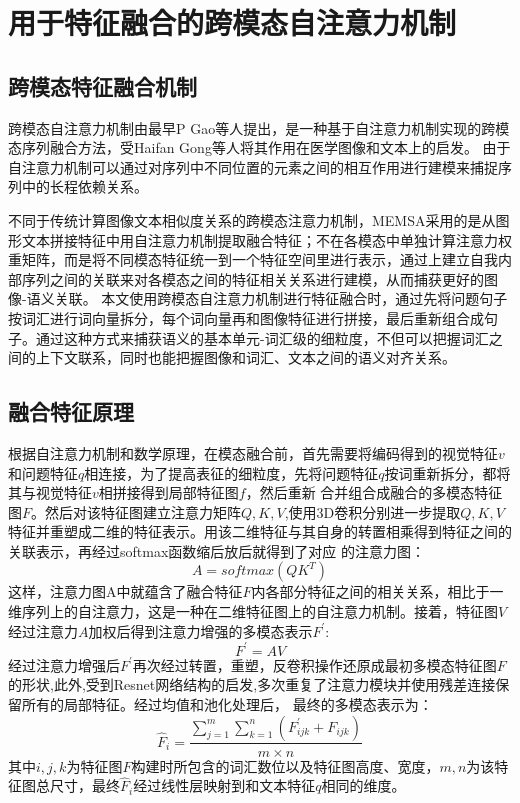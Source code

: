\section{用于特征融合的跨模态自注意力机制}
\subsection{跨模态特征融合机制}
跨模态自注意力机制由最早P Gao等人\cite{gao2019dynamic}提出，是一种基于自注意力机制实现的跨模态序列融合方法，受Haifan Gong等人\cite{gong2021cross}将其作用在医学图像和文本上的启发。
由于自注意力机制可以通过对序列中不同位置的元素之间的相互作用进行建模来捕捉序列中的长程依赖关系。

不同于传统计算图像文本相似度关系的跨模态注意力机制，MEMSA采用的是从图形文本拼接特征中用自注意力机制提取融合特征；不在各模态中单独计算注意力权重矩阵，而是将不同模态特征统一到一个特征空间里进行表示，通过上建立自我内部序列之间的关联来对各模态之间的特征相关关系进行建模，从而捕获更好的图像-语义关联。
本文使用跨模态自注意力机制进行特征融合时，通过先将问题句子按词汇进行词向量拆分，每个词向量再和图像特征进行拼接，最后重新组合成句子。通过这种方式来捕获语义的基本单元-词汇级的细粒度，不但可以把握词汇之间的上下文联系，同时也能把握图像和词汇、文本之间的语义对齐关系。

\subsection{融合特征原理}
根据自注意力机制和数学原理，在模态融合前，首先需要将编码得到的视觉特征$v$和问题特征$q$相连接，为了提高表征的细粒度，先将问题特征$q$按词重新拆分，都将其与视觉特征$v$相拼接得到局部特征图$f$，然后重新
合并组合成融合的多模态特征图$F$。然后对该特征图建立注意力矩阵$Q,K,V$,使用3D卷积分别进一步提取$Q,K,V$特征并重塑成二维的特征表示。用该二维特征与其自身的转置相乘得到特征之间的关联表示，再经过softmax函数缩后放后就得到了对应
的注意力图：
\begin{equation}
	\label{}
	A = softmax(QK^{T})
\end{equation}
这样，注意力图A中就蕴含了融合特征$F$内各部分特征之间的相关关系，相比于一维序列上的自注意力，这是一种在二维特征图上的自注意力机制。接着，特征图$V$经过注意力$A$加权后得到注意力增强的多模态表示$F^{\prime}$:
\begin{equation}
	\label{}
	F^{\prime} = A V
\end{equation}
经过注意力增强后$F^{\prime}$再次经过转置，重塑，反卷积操作还原成最初多模态特征图$F$的形状,此外,受到Resnet网络结构的启发,多次重复了注意力模块并使用残差连接保留所有的局部特征。经过均值和池化处理后，
最终的多模态表示为：
\begin{equation}
	\label{}
	\hat{F}_i=\frac{\sum_{j=1}^m \sum_{k=1}^n\left(F_{i j k}^{\prime}+F_{i j k}\right)}{m \times n}
\end{equation}
其中$i,j,k$为特征图$F$构建时所包含的词汇数位以及特征图高度、宽度，$m,n$为该特征图总尺寸，最终$\hat{F}_i$经过线性层映射到和文本特征$q$相同的维度。

